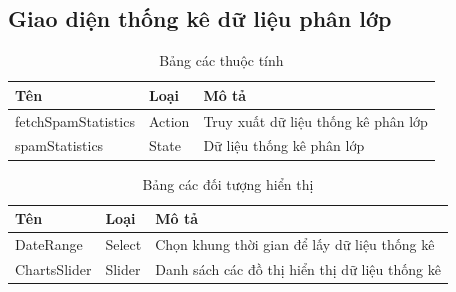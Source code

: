   \subsection{Giao diện thống kê dữ liệu phân lớp}
  \begin{table}[H]
    \centering
    \setlength{\tabcolstep}{12pt}
    \begin{tabular}{@{}lll@{}} \toprule
      Tên  & Loại   & Mô tả \\ \midrule
      fetchSpamStatistics &  Action   &  Truy xuất dữ liệu thống kê phân lớp \\
      spamStatistics  &  State  & Dữ liệu thống kê phân lớp \\ \bottomrule
    \end{tabular}
    \caption{Bảng các thuộc tính}
  \end{table}

  \begin{table}[H]
    \centering
    \setlength{\tabcolstep}{12pt}
    \begin{tabular}{@{}lll@{}} \toprule
      Tên  & Loại   & Mô tả \\ \midrule
      DateRange   &  Select & Chọn khung thời gian để lấy dữ liệu thống kê \\
      ChartsSlider   & Slider &  Danh sách các đồ thị hiển thị dữ liệu thống kê \\ \bottomrule
    \end{tabular}
    \caption{Bảng các đối tượng hiển thị}
  \end{table}
